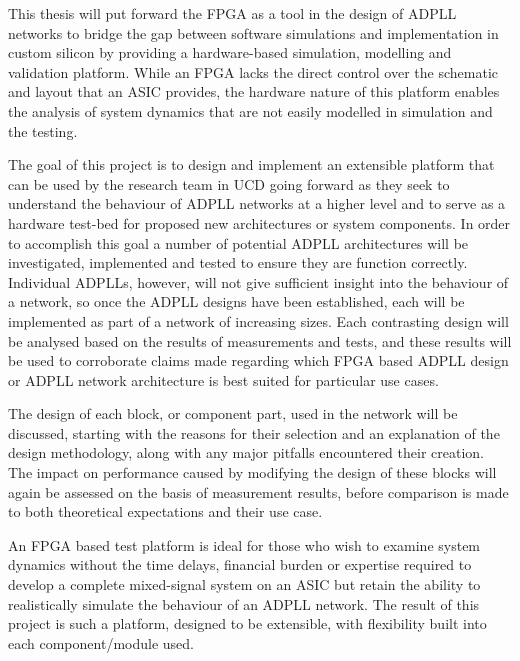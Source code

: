 This thesis will put forward the \ac{FPGA} as a tool in the design of \ac{ADPLL} networks to bridge the gap between software simulations and implementation in custom silicon by providing a hardware-based simulation, modelling and validation platform. While an FPGA lacks the direct control over the schematic and layout that an \ac{ASIC} provides, the hardware nature of this platform enables the analysis of system dynamics that are not easily modelled in simulation and the testing.

The goal of this project is to design and implement an extensible platform that can be used by the research team in \ac{UCD} going forward as they seek to understand the behaviour of \ac{ADPLL} networks at a higher level and to serve as a hardware test-bed for proposed new architectures or system components. In order to accomplish this goal a number of potential \ac{ADPLL} architectures will be investigated, implemented and tested to ensure they are function correctly. Individual \acsp{ADPLL}, however, will not give sufficient insight into the behaviour of a network, so once the \ac{ADPLL} designs have been established, each will be implemented as part of a network of increasing sizes. Each contrasting design will be analysed based on the results of measurements and tests, and these results will be used to corroborate claims made regarding which \ac{FPGA} based \ac{ADPLL} design or \ac{ADPLL} network architecture is best suited for particular use cases.

The design of each block, or component part, used in the network will be discussed, starting with the reasons for their selection and an explanation of the design methodology, along with any major pitfalls encountered their creation. The impact on performance caused by modifying the design of these blocks will again be assessed on the basis of measurement results, before comparison is made to both theoretical expectations and their use case.

An \ac{FPGA} based test platform is ideal for those who wish to examine system dynamics without the time delays, financial burden or expertise required to develop a complete mixed-signal system on an \ac{ASIC} but retain the ability to realistically simulate the behaviour of an \ac{ADPLL} network. The result of this project is such a platform, designed to be extensible, with flexibility built into each component/module used.